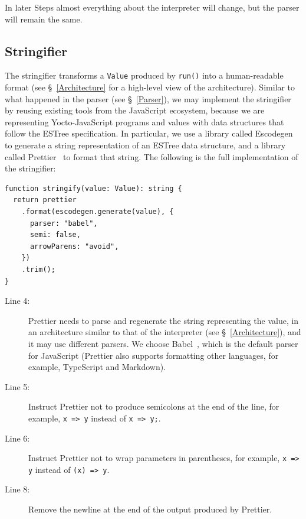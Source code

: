 \documentclass[12pt, oneside]{book}
\begin{document}
In later Steps almost everything about the interpreter will change, but the parser will remain the same.

\subsection{Stringifier}
\label{Step 0: Stringifier}

The stringifier transforms a \texttt{Value} produced by \texttt{run()} into a human-readable format (see §~\ref{Architecture} for a high-level view of the architecture). Similar to what happened in the parser (see §~\ref{Parser}), we may implement the stringifier by reusing existing tools from the JavaScript ecosystem, because we are representing Yocto-JavaScript programs and values with data structures that follow the ESTree specification. In particular, we use a library called Escodegen~\cite{escodegen} to generate a string representation of an ESTree data structure, and a library called Prettier~\cite{prettier} to format that string. The following is the full implementation of the stringifier:

\begin{verbatim}
function stringify(value: Value): string {
  return prettier
    .format(escodegen.generate(value), {
      parser: "babel",
      semi: false,
      arrowParens: "avoid",
    })
    .trim();
}
\end{verbatim}

\begin{description}
\item [Line 4:] Prettier needs to parse and regenerate the string representing the value, in an architecture similar to that of the interpreter (see §~\ref{Architecture}), and it may use different parsers. We choose Babel~\cite{babel}, which is the default parser for JavaScript (Prettier also supports formatting other languages, for example, TypeScript and Markdown).

\item [Line 5:] Instruct Prettier not to produce semicolons at the end of the line, for example, \texttt{x => y} instead of \texttt{x => y;}.

\item [Line 6:] Instruct Prettier not to wrap parameters in parentheses, for example, \texttt{x => y} instead of \texttt{(x) => y}.

\item [Line 8:] Remove the newline at the end of the output produced by Prettier.
\end{description}
\end{document}
